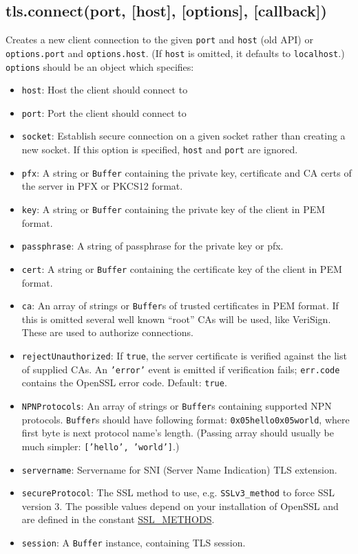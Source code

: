 \subsection{tls.connect(port, {[}host{]}, {[}options{]},
{[}callback{]})}\label{tls.connectport-host-options-callback}

Creates a new client connection to the given \texttt{port} and
\texttt{host} (old API) or \texttt{options.port} and
\texttt{options.host}. (If \texttt{host} is omitted, it defaults to
\texttt{localhost}.) \texttt{options} should be an object which
specifies:

\begin{itemize}
\item
  \texttt{host}: Host the client should connect to
\item
  \texttt{port}: Port the client should connect to
\item
  \texttt{socket}: Establish secure connection on a given socket rather
  than creating a new socket. If this option is specified, \texttt{host}
  and \texttt{port} are ignored.
\item
  \texttt{pfx}: A string or \texttt{Buffer} containing the private key,
  certificate and CA certs of the server in PFX or PKCS12 format.
\item
  \texttt{key}: A string or \texttt{Buffer} containing the private key
  of the client in PEM format.
\item
  \texttt{passphrase}: A string of passphrase for the private key or
  pfx.
\item
  \texttt{cert}: A string or \texttt{Buffer} containing the certificate
  key of the client in PEM format.
\item
  \texttt{ca}: An array of strings or \texttt{Buffer}s of trusted
  certificates in PEM format. If this is omitted several well known
  ``root'' CAs will be used, like VeriSign. These are used to authorize
  connections.
\item
  \texttt{rejectUnauthorized}: If \texttt{true}, the server certificate
  is verified against the list of supplied CAs. An \texttt{'error'}
  event is emitted if verification fails; \texttt{err.code} contains the
  OpenSSL error code. Default: \texttt{true}.
\item
  \texttt{NPNProtocols}: An array of strings or \texttt{Buffer}s
  containing supported NPN protocols. \texttt{Buffer}s should have
  following format: \texttt{0x05hello0x05world}, where first byte is
  next protocol name's length. (Passing array should usually be much
  simpler: \texttt{{[}'hello', 'world'{]}}.)
\item
  \texttt{servername}: Servername for SNI (Server Name Indication) TLS
  extension.
\item
  \texttt{secureProtocol}: The SSL method to use, e.g.
  \texttt{SSLv3\_method} to force SSL version 3. The possible values
  depend on your installation of OpenSSL and are defined in the constant
  \href{http://www.openssl.org/docs/ssl/ssl.html\#DEALING_WITH_PROTOCOL_METHODS}{SSL\_METHODS}.
\item
  \texttt{session}: A \texttt{Buffer} instance, containing TLS session.
\end{itemize}

